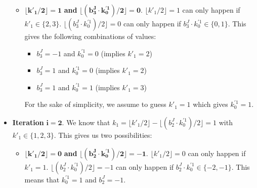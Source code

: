 \begin{itemize}
\begin{itemize}
		\item $\bm { \lfloor k'_1 / 2 \rfloor = 1 }$ \textbf{and} $ \bm{ \lfloor (b_3^J \cdot k_0^{\prime 1}) / 2 \rfloor = 0 }$.
		$\lfloor k'_1 / 2 \rfloor = 1$ can only happen if $k'_1 \in \{2, 3\}$. $ \lfloor (b_3^J \cdot k_0^{\prime 1}) / 2 \rfloor = 0$ can only happen if $b_3^J \cdot k_0^{\prime 1} \in \{0, 1\}$. This gives the following combinations of values:
		\begin{itemize}
			\item $b_3^J = -1$ and $ k_0^{\prime 1} = 0$ (implies $k'_1 = 2$)
			\item $b_3^J = 1$ and $ k_0^{\prime 1} = 0$ (implies $k'_1 = 2$)
			\item $b_3^J = 1$ and $ k_0^{\prime 1} = 1$ (implies $k'_1 = 3$)
		\end{itemize}
		For the sake of simplicity, we assume to guess $k'_1 = 1$ which gives $k_0^{\prime 1} = 1$.
	\end{itemize}
	\item \textbf{Iteration} $\bm{i = 2}$. We know that $k_1 = \lfloor k'_1 / 2 \rfloor - \lfloor (b_2^J \cdot k_0^{\prime 1}) / 2 \rfloor = 1$ with $k'_1 \in \{1, 2, 3\}$. This gives us two possibilities:
	\begin{itemize}
		\item $\bm{ \lfloor k'_1 / 2 \rfloor = 0 }$ \textbf{and} $ \bm{ \lfloor (b_2^J \cdot k_0^{\prime 1}) / 2 \rfloor = -1 }$. 
		$\lfloor k'_1 / 2 \rfloor = 0 $ can only happen if $k'_1 = 1$. $\lfloor (b_2^J \cdot k_0^{\prime 1}) / 2 \rfloor = -1$ can only happen if $b_2^J \cdot k_0^{\prime 1} \in \{-2, -1\}$. This means that $k_0^{\prime 1} = 1$ and $b_2^J = -1$.
		

\end{itemize}
\end{itemize}
